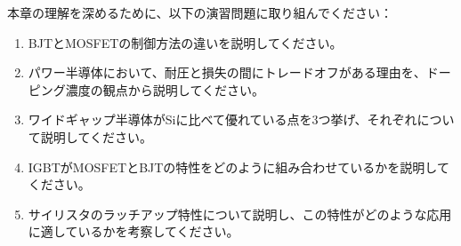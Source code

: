 本章の理解を深めるために、以下の演習問題に取り組んでください：

\begin{enumerate}
\item BJTとMOSFETの制御方法の違いを説明してください。

\item パワー半導体において、耐圧と損失の間にトレードオフがある理由を、ドーピング濃度の観点から説明してください。

\item ワイドギャップ半導体がSiに比べて優れている点を3つ挙げ、それぞれについて説明してください。

\item IGBTがMOSFETとBJTの特性をどのように組み合わせているかを説明してください。

\item サイリスタのラッチアップ特性について説明し、この特性がどのような応用に適しているかを考察してください。
\end{enumerate}
